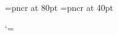
\font\gre@fontofbiginitial=pncr at 80pt%
\font\gre@fontofinitial=pncr at 40pt%

\def\gre@style@initial{%
  \begingroup%
  \gre@fontofinitial%
  \relax %
}%
\def\endgre@style@initial{\endgroup}%

\def\gre@style@biginitial{%
  \begingroup%
  \gre@fontofbiginitial%
  \relax %
}%
\def\endgre@style@biginitial{\endgroup}%

\def\gre@style@translation{%
  \begingroup%
  \it%
}%
\def\endgre@style@translation{\endgroup}%

\def\gre@style@abovelinestext{%
  \begingroup%
  \it%
}%
\def\endgre@style@abovelinestext{\endgroup}%

\def\gre@style@normalstafflines{%
  \begingroup%
  \relax%
}%
\def\endgre@style@normalstafflines{\endgroup}%

\def\gre@style@additionalstafflines{%
  \begingroup%
  \gre@style@normalstafflines%
}%
\def\endgre@style@additionalstafflines{%
  \endgre@style@normalstafflines%
  \endgroup%
}%

\def\gre@style@lowchoralsign{%
  \begingroup%
  \relax%
}%
\def\endgre@style@lowchoralsign{\endgroup}%

\def\gre@style@highchoralsign{%
  \begingroup%
  \relax%
}%
\def\endgre@style@highchoralsign{\endgroup}%

\def\gre@style@firstsyllableinitial{%
  \begingroup%
  \relax%
}%
\def\endgre@style@firstsyllableinitial{\endgroup}%

\def\gre@style@firstsyllable{%
  \begingroup%
  \relax%
}%
\def\endgre@style@firstsyllable{\endgroup}%

\def\gre@style@modeline{%
  \begingroup%
  \bf%
  \sc%
  \relax%
}%
\def\endgre@style@modeline{\endgroup}%

\def\gre@style@nabc{%
  \begingroup%
  \relax%
}
\def\endgre@style@nabc{\endgroup}%

\def\gre@changestyle#1#2[#3]{%
  \gdef\csname gre@style@#1\endcsname{\begingroup#2}%
  \gdef\csname endgre@style@#1\endcsname{#3\endgroup}%
}%

\catcode`\@=\greoldcatcode
